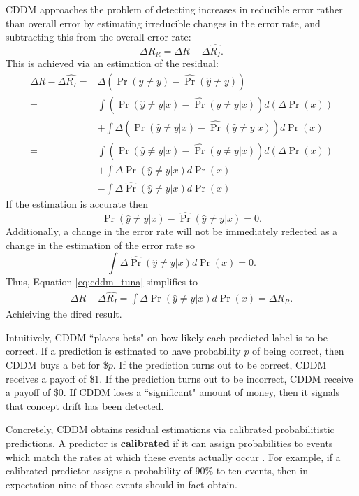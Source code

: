 CDDM approaches the problem of detecting increases in reducible error rather than overall error by estimating irreducible changes in the error rate, and subtracting this from the overall error rate:
\begin{equation}
	\Delta R_R = \Delta R - \Delta \hat{R_I}.
\end{equation}
This is achieved via an estimation of the residual:
\begin{align}
	\Delta R - \Delta \hat{R_I} =& \Delta \left( \Pr(\hat{y}\ne y) - \hat{\Pr}(\hat{y}\ne y) \right) \label{eq:cddm_tuna} \\
	=& \int \left( \Pr(\hat{y}\ne y|x) - \hat{\Pr}(\hat{y}\ne y|x) \right) d\left(\Delta \Pr(x)\right) \\
	 &+ \int \Delta \left( \Pr(\hat{y}\ne y|x) - \hat{\Pr}(\hat{y}\ne y|x) \right) d\Pr(x) \\
	=& \int \left( \Pr(\hat{y}\ne y|x) - \hat{\Pr}(\hat{y}\ne y|x) \right) d\left(\Delta \Pr(x)\right) \\
	 &+ \int \Delta \Pr(\hat{y}\ne y|x) d\Pr(x) \\
	 &- \int \Delta \hat{\Pr}(\hat{y}\ne y|x) d\Pr(x)
\end{align}
If the estimation is accurate then
\begin{equation}
	\Pr(\hat{y}\ne y|x) - \hat{\Pr}(\hat{y}\ne y|x) = 0.
\end{equation}
Additionally, a change in the error rate will not be immediately reflected as a change in the estimation of the error rate so 
\begin{equation}
	 \int \Delta \hat{\Pr}(\hat{y}\ne y|x) d\Pr(x) = 0.
\end{equation}
Thus, Equation \ref{eq:cddm_tuna} simplifies to
\begin{align}
	\Delta R - \Delta \hat{R_I} = \int \Delta \Pr(\hat{y}\ne y|x) d\Pr(x) = \Delta R_R.
\end{align}
Achieiving the dired result.

Intuitively, CDDM ``places bets" on how likely each predicted label is to be correct. If a prediction is estimated to have probability $p$ of being correct, then CDDM buys a bet for \$$p$. If the prediction turns out to be correct, CDDM receives a payoff of \$1. If the prediction turns out to be incorrect, CDDM receive a payoff of \$0. If CDDM loses a ``significant" amount of money, then it signals that concept drift has been detected.

Concretely, CDDM obtains residual estimations via calibrated probabilitistic predictions. A predictor is {\bf calibrated} if it can assign probabilities to events which match the rates at which these events actually occur \cite{superforecasting}\cite{scoring_rules}\cite{calibrating}. For example, if a calibrated predictor assigns a probability of 90\% to ten events, then in expectation nine of those events should in fact obtain. 

